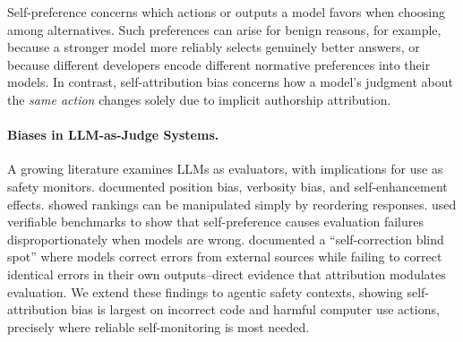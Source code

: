 
Self-preference concerns which actions or outputs a model favors when choosing among alternatives. Such preferences can arise for benign reasons, for example, because a stronger model more reliably selects genuinely better answers, or because different developers encode different normative preferences into their models. In contrast, self-attribution bias concerns how a model’s judgment about the \emph{same action} changes solely due to implicit authorship attribution. 






\paragraph{Biases in LLM-as-Judge Systems.}
A growing literature examines LLMs as evaluators, with implications for use as safety monitors. \citet{zheng2023judgingllmasajudge} documented position bias, verbosity bias, and self-enhancement effects. \citet{wang2023largelanguagemodelsare} showed rankings can be manipulated simply by reordering responses. \citet{chen2025dollmevaluatorsprefer} used verifiable benchmarks to show that self-preference causes evaluation failures disproportionately when models are wrong. \citet{tsui2025selfcorrectionbench} documented a ``self-correction blind spot'' where models correct errors from external sources while failing to correct identical errors in their own outputs--direct evidence that attribution modulates evaluation. We extend these findings to agentic safety contexts, showing self-attribution bias is largest on incorrect code and harmful computer use actions, precisely where reliable self-monitoring is most needed.

